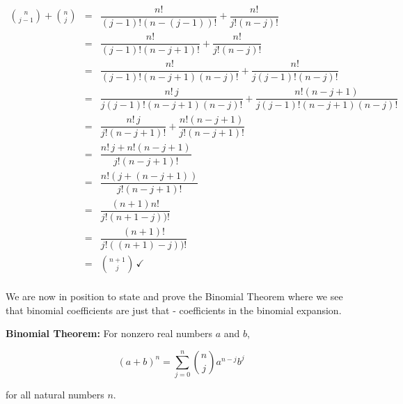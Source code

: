 \[ \begin{array}{rcl}

\displaystyle{\binom{n}{j-1} + \binom{n}{j}} & = & \dfrac{n!}{(j-1)! (n-(j-1))!} + \dfrac{n!}{j! (n-j)!}  \\ [15pt]

& = & \dfrac{n!}{(j-1)! (n-j+1)!} + \dfrac{n!}{j! (n-j)!}  \\ [15pt]

& = & \dfrac{n!}{(j-1)! (n-j+1)(n-j)!} + \dfrac{n!}{j(j-1)! (n-j)!}  \\ [15pt]

& = & \dfrac{n! \, j}{j(j-1)! (n-j+1)(n-j)!} + \dfrac{n! (n-j+1)}{j(j-1)! (n-j+1)(n-j)!} \\ [15pt]

& = & \dfrac{n! \, j}{j! (n-j+1)!} + \dfrac{n! (n-j+1)}{j! (n-j+1)!} \\ [15pt]

& = & \dfrac{n! \, j + n! (n-j+1)}{j! (n-j+1)!} \\ [15pt]

& = & \dfrac{n!\left( j + (n-j+1)\right)}{j! (n-j+1)!} \\ [15pt]

& = & \dfrac{(n+1) n!}{j! (n+1-j))!} \\ [15pt] 

& = & \dfrac{(n+1)!} {j! ((n+1)-j))!} \\ [15pt]

& = & \displaystyle{\binom{n+1}{j}} \, \checkmark \\ 

\end{array} \]

We are now in position to state and prove the Binomial Theorem where we see that binomial coefficients are just that - coefficients in the binomial expansion.

\smallskip

\colorbox{ResultColor}{\bbm

\begin{thm}  \label{BinomialTheorem}  \textbf{Binomial Theorem:}  For nonzero real numbers $a$ and $b$,

\[(a+b)^{n} =\displaystyle{\sum_{j=0}^{n} \binom{n}{j} a^{n-j} b^{j}} \]

for all natural numbers $n$.

\end{thm}

\ebm}

\smallskip

